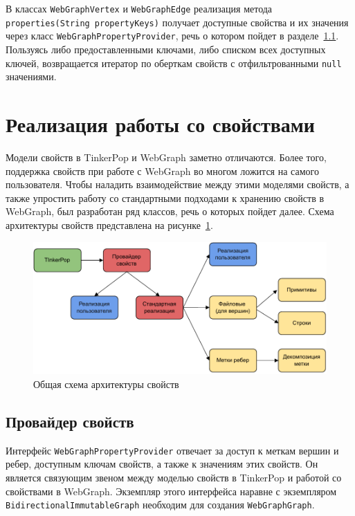 \documentclass[times,specification,annotation]{itmo-student-thesis}
\begin{document}
В классах \texttt{WebGraphVertex} и \texttt{WebGraphEdge} реализация метода \texttt{properties(String propertyKeys)} получает доступные свойства и их значения через класс \texttt{WebGraphPropertyProvider}, речь о котором пойдет в разделе~\ref{sec:provider}. Пользуясь либо предоставленными ключами, либо списком всех доступных ключей, возвращается итератор по оберткам свойств с отфильтрованными \texttt{null} значениями.

\section{Реализация работы со свойствами}\label{sec:props}

Модели свойств в TinkerPop и WebGraph заметно отличаются. Более того, поддержка свойств при работе с WebGraph во многом ложится на самого пользователя. Чтобы наладить взаимодействие между этими моделями свойств, а также упростить работу со стандартными подходами к хранению свойств в WebGraph, был разработан ряд классов, речь о которых пойдет далее. Схема архитектуры свойств представлена на рисунке~\ref{props-diagram}.

\begin{figure}[!h]
\caption{Общая схема архитектуры свойств}\label{props-diagram}
\centering
\includegraphics{img/props.pdf}
\end{figure}

\subsection{Провайдер свойств}\label{sec:provider}

Интерфейс \texttt{WebGraphPropertyProvider} отвечает за доступ к меткам вершин и ребер, доступным ключам свойств, а также к значениям этих свойств. Он является связующим звеном между моделью свойств в TinkerPop и работой со свойствами в WebGraph. Экземпляр этого интерфейса наравне с экземпляром \texttt{BidirectionalImmutableGraph} необходим для создания \texttt{WebGraphGraph}.
\end{document}

